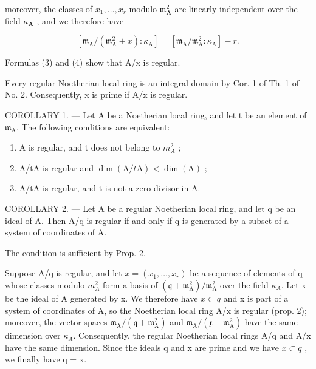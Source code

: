 moreover, the classes of \(x_{1},\ldots,x_{r}\) modulo \(\mathfrak{m}_{\mathbf{A}}^{2}\) are linearly independent over the field \(\kappa_{\mathbf{A}}\) , and we therefore have

\[
\left[ \mathfrak {m} _ {\mathrm{A}} / (\mathfrak {m} _ {\mathrm{A}} ^ {2} + x): \kappa_ {\mathrm{A}} \right] = \left[ \mathfrak {m} _ {\mathrm{A}} / \mathfrak {m} _ {\mathrm{A}} ^ {2}: \kappa_ {\mathrm{A}} \right] - r.\tag{4}
\]

Formulas (3) and (4) show that A/x is regular.

Every regular Noetherian local ring is an integral domain by Cor. 1 of Th. 1 of No. 2. Consequently, x is prime if A/x is regular.

COROLLARY 1. --- Let A be a Noetherian local ring, and let t be an element of \(\mathfrak{m}_{\mathrm{A}}\). The following conditions are equivalent:

\begin{enumerate}
\def\labelenumi{(\roman{enumi})}
\item
  A is regular, and t does not belong to \(m_{A}^{2}\) ;
\item
  A/tA is regular and \(\dim(\mathrm{A}/t\mathrm{A}) < \dim(\mathrm{A})\) ;
\item
  A/tA is regular, and t is not a zero divisor in A.
\end{enumerate}

COROLLARY 2. --- Let A be a regular Noetherian local ring, and let q be an ideal of A. Then A/q is regular if and only if q is generated by a subset of a system of coordinates of A.

The condition is sufficient by Prop. 2.

Suppose A/q is regular, and let \(x = (x_{1}, \ldots, x_{r})\) be a sequence of elements of q whose classes modulo \(m_{A}^{2}\) form a basis of \((\mathfrak{q} + \mathfrak{m}_{\mathrm{A}}^{2})/\mathfrak{m}_{\mathrm{A}}^{2}\) over the field \(\kappa_{A}\). Let x be the ideal of A generated by x. We therefore have \(x \subset q\) and x is part of a system of coordinates of A, so the Noetherian local ring A/x is regular (prop. 2); moreover, the vector spaces \(\mathfrak{m}_{\mathrm{A}}/(\mathfrak{q} + \mathfrak{m}_{\mathrm{A}}^{2})\) and \(\mathfrak{m}_{\mathrm{A}}/(\mathfrak{x} + \mathfrak{m}_{\mathrm{A}}^{2})\) have the same dimension over \(\kappa_{A}\). Consequently, the regular Noetherian local rings A/q and A/x have the same dimension. Since the ideals q and x are prime and we have \(x \subset q\) , we finally have q = x.

